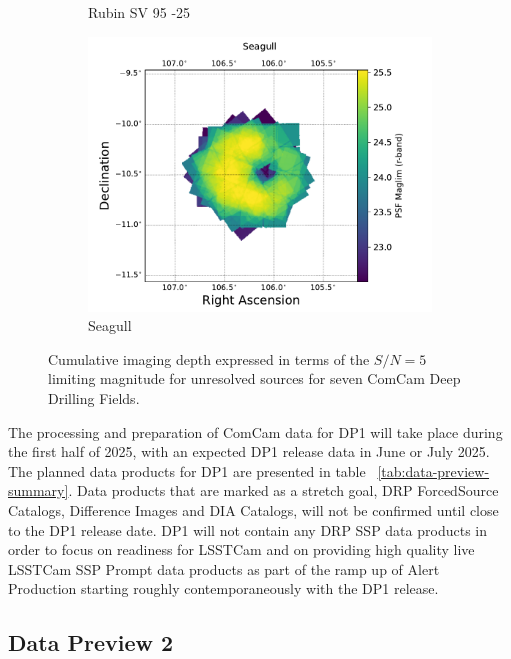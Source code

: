 \begin{figure}[htbp]
\begin{subfigure}[b]{0.3\textwidth}
        \caption{Rubin SV 95 -25}
        \label{fig:img7}
    \end{subfigure}
    \hfill
    \begin{subfigure}[b]{0.3\textwidth}
        \centering
        \includegraphics[width=\textwidth]{figures/comcam_psf_maglim_seagull_r.pdf}
        \caption{Seagull}
        \label{fig:img8}
    \end{subfigure}
    
     \caption{Cumulative imaging depth expressed in terms of the $S/N=5$ limiting magnitude for unresolved sources for seven ComCam Deep Drilling Fields.}
     \label{fig:all_images}
\end{figure}

The  processing and preparation of ComCam data for DP1 will take place during the first half of 2025, with an expected DP1 release data in June or July 2025. 
The planned data products for DP1 are presented in table~ \ref{tab:data-preview-summary}. 
Data products that are marked as a stretch goal, DRP ForcedSource Catalogs, Difference Images and DIA Catalogs,  will not be confirmed until close to the DP1 release date. 
DP1 will not contain any DRP  SSP data products in order to focus on readiness for LSSTCam and on providing high quality live LSSTCam SSP Prompt data products as part of the ramp up of Alert Production starting roughly contemporaneously with the DP1 release.


\subsection{Data Preview 2}
\label{sec:dp2}


